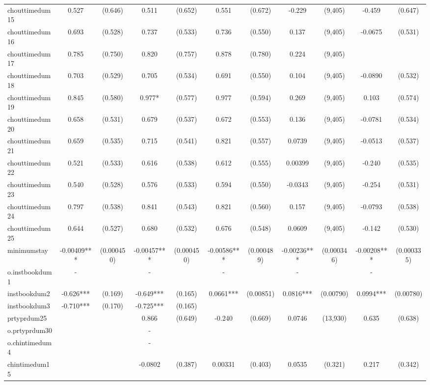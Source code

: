 \documentclass[]{article}
\begin{document}
\begin{tabular}{lcccccccccc}
chouttimedum15 & 0.527 & (0.646) & 0.511 & (0.652) & 0.551 & (0.672) & -0.229 & (9,405) & -0.459 & (0.647) \\
chouttimedum16 & 0.693 & (0.528) & 0.737 & (0.533) & 0.736 & (0.550) & 0.137 & (9,405) & -0.0675 & (0.531) \\
chouttimedum17 & 0.785 & (0.750) & 0.820 & (0.757) & 0.878 & (0.780) & 0.224 & (9,405) &  &  \\
chouttimedum18 & 0.703 & (0.529) & 0.705 & (0.534) & 0.691 & (0.550) & 0.104 & (9,405) & -0.0890 & (0.532) \\
chouttimedum19 & 0.845 & (0.580) & 0.977* & (0.577) & 0.977 & (0.594) & 0.269 & (9,405) & 0.103 & (0.574) \\
chouttimedum20 & 0.658 & (0.531) & 0.679 & (0.537) & 0.672 & (0.553) & 0.136 & (9,405) & -0.0781 & (0.534) \\
chouttimedum21 & 0.659 & (0.535) & 0.715 & (0.541) & 0.821 & (0.557) & 0.0739 & (9,405) & -0.0513 & (0.537) \\
chouttimedum22 & 0.521 & (0.533) & 0.616 & (0.538) & 0.612 & (0.555) & 0.00399 & (9,405) & -0.240 & (0.535) \\
chouttimedum23 & 0.540 & (0.528) & 0.576 & (0.533) & 0.594 & (0.550) & -0.0343 & (9,405) & -0.254 & (0.531) \\
chouttimedum24 & 0.797 & (0.538) & 0.841 & (0.543) & 0.821 & (0.560) & 0.157 & (9,405) & -0.0793 & (0.538) \\
chouttimedum25 & 0.644 & (0.527) & 0.680 & (0.532) & 0.676 & (0.548) & 0.0609 & (9,405) & -0.142 & (0.530) \\
minimumstay & -0.00409*** & (0.000450) & -0.00457*** & (0.000450) & -0.00586*** & (0.000489) & -0.00236*** & (0.000346) & -0.00208*** & (0.000335) \\
o.instbookdum1 & - &  & - &  & - &  & - &  & - &  \\
instbookdum2 & -0.626*** & (0.169) & -0.649*** & (0.165) & 0.0661*** & (0.00851) & 0.0816*** & (0.00790) & 0.0994*** & (0.00780) \\
instbookdum3 & -0.710*** & (0.170) & -0.725*** & (0.165) &  &  &  &  &  &  \\
prtyprdum25 &  &  & 0.866 & (0.649) & -0.240 & (0.669) & 0.0746 & (13,930) & 0.635 & (0.638) \\
o.prtyprdum30 &  &  & - &  &  &  &  &  &  &  \\
o.chintimedum4 &  &  & - &  &  &  &  &  &  &  \\
chintimedum15 &  &  & -0.0802 & (0.387) & 0.00331 & (0.403) & 0.0535 & (0.321) & 0.217 & (0.342) \\

\end{tabular}
\end{document}
